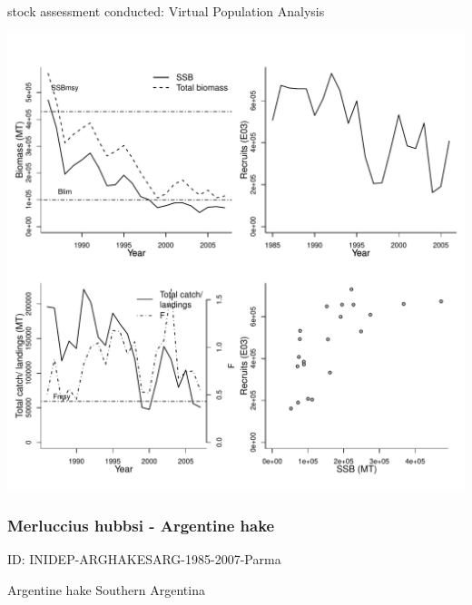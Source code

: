 stock assessment conducted: Virtual Population Analysis 
\begin{center}
\vspace{-0.2cm}\includegraphics[scale=0.65]{../tex/figures/plot-INIDEP-ARGHAKENARG-1985-2007-Parma.pdf}
\end{center}

\newpage
\subsubsection{Merluccius hubbsi - Argentine hake}
ID: INIDEP-ARGHAKESARG-1985-2007-Parma

Argentine hake Southern Argentina 

